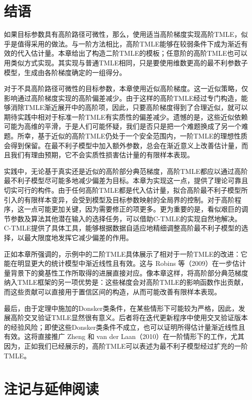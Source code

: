 \section{结语}

如果目标参数具有高阶路径可微性，那么，使用适当高阶梯度实现高阶TMLE，似乎是值得采用的做法。与一阶方法相比，高阶TMLE能够在较弱条件下成为渐近有效的代入估计量。本章给出了构造二阶TMLE的模板；任意阶的高阶TMLE也可以用类似方式实现。其实现与普通TMLE相同，只是要使用维数更高的最不利参数子模型，生成由各阶梯度确定的一组得分。

对于不具高阶路径可微性的目标参数，本章使用近似高阶梯度。这一近似策略，仅影响通过高阶梯度实现的高阶偏差减少。由于这样的高阶TMLE经过专门构造，能够消除TMLE渐近展开中的高阶项，因此，只要高阶梯度得到了合理近似，就可以期待实践中相对于标准一阶TMLE有实质性的偏差减少。遗憾的是，这些近似依赖可能为高维的平滑，于是人们可能怀疑，我们是否只是把一个难题换成了另一个难题。所幸，基于近似的高阶TMLE仍处于一个安全范围内，一阶TMLE的理想性质会得到保留。在最不利子模型中加入额外参数，总会在渐近意义上改善估计量，而且我们有理由预期，它不会实质性损害估计量的有限样本表现。

实践中，无论基于真实还是近似的高阶部分典范梯度，高阶TMLE都应以通过高阶最不利子模型尽可能多地减少偏差为目标。本章为实现这一点，提供了理论可靠且切实可行的构件。由于任何高阶TMLE都是代入估计量，拟合高阶最不利子模型所引入的有限样本变异，会受到模型及目标参数映射的全局界的控制。对于高阶程序，这一点可能更加关键，因为需要修正的项更多。更为重要的是，看似艰巨的调节参数及算法其他潜在输入的选择任务，可以借助C-TMLE的实现自然地解决。C-TMLE提供了具体工具，能够根据数据自适应地精细调整高阶最不利子模型的选择，以最大限度地发挥它减少偏差的作用。

正如本章所强调的，示例中的二阶TMLE具体展示了相对于一阶TMLE的改进：它能在明显更大的统计模型中渐近线性且有效。这与 Robins 等（2009）在一步估计量背景下的奠基性工作所取得的进展直接对应。像本章这样，将高阶部分典范梯度纳入TMLE框架的另一项优势是：这些梯度会对高阶TMLE的影响函数作出贡献，而这些贡献可以直接用于置信区间的构造，从而可能改善有限样本表现。

最后，由于定理中施加的Donsker类条件，在某些情形下可能较为严格，因此，发展高阶交叉验证TMLE显然很有意义。后者将在迭代更新程序中使用交叉验证版本的经验风险；即使这些Donsker类条件不成立，也可以证明所得估计量渐近线性且有效。这将直接推广 Zheng 和 van der Laan（2010）在一阶情形下的工作，尤其因为，正如我们已经展示的，高阶TMLE可以表述为最不利子模型经过扩充的一阶TMLE。

\section{注记与延伸阅读}

